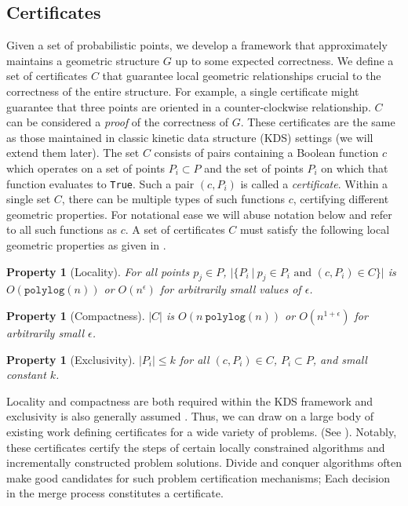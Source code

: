 \documentclass[11pt]{article}
\newtheorem{property}[theorem]{Property}
\newcommand{\polylog}{\texttt{polylog}}
\begin{document}
\subsection{Certificates}
\label{intro:certificates}
 Given a set of probabilistic points, we develop a framework that approximately maintains a geometric structure $G$ up to some expected correctness. We define a set of certificates $C$ that guarantee local geometric relationships crucial to the correctness of the entire structure.  For example, a single certificate might guarantee that three points are oriented in a counter-clockwise relationship.  $C$ can be considered a \emph{proof} of the correctness of $G$. These certificates are the same as those  maintained in classic kinetic data structure (KDS) settings \cite{Basch99MobileData} (we will extend them later).  The set $C$ consists of pairs containing a Boolean function $c$ which operates on a set of points $P_i \subset P$ and the set of points $P_i$ on which that function evaluates to \texttt{True}.  Such a pair $(c, P_i)$ is called a \emph{certificate}.  Within a single set $C$, there can be multiple types of such functions $c$, certifying different geometric properties.  For notational ease we will abuse notation below and refer to all such functions as $c$.  A set of certificates $C$ must satisfy the following local geometric properties  as given in \cite{Basch99MobileData}.

\begin{property}[Locality]
\label{def:locality}
For all points $p_j \in P$, $| \{ P_i ~|~ p_j \in P_i \mbox{ and } (c,P_i) \in C \} |$ is $O(\polylog(n))$ or $O(n^\epsilon)$ for arbitrarily small values of $\epsilon$.
\end{property} 

\begin{property}[Compactness]
\label{def:compactness}
$|C|$ is $O(n ~\polylog(n))$ or $O(n^{1 + \epsilon})$ for arbitrarily small $\epsilon$.
\end{property}

\begin{property}[Exclusivity]
\label{def:exclusivity}
$|P_i| \leq k$ for all $(c,P_i) \in C$, $P_i \subset P$,  and small constant $k$.
\end{property}


Locality and compactness are both required within the KDS framework and exclusivity is also generally assumed \cite{Basch99MobileData}.  Thus, we can draw on a large body of existing work defining certificates for a wide variety of problems.  (See \cite{Guibas04Kinetic}).  Notably, these certificates certify the steps of certain locally constrained algorithms and incrementally constructed problem solutions.  Divide and conquer algorithms often make good candidates for such problem certification mechanisms; Each decision in the merge process constitutes a certificate.
\end{document}
